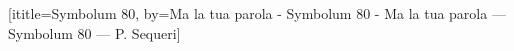 




[ititle={Symbolum 80}, by={\ifacinquevert \iftwocolumns Ma la tua parola - Symbolum 80 - \else Ma la tua parola — Symbolum 80 — \fi\fi  P. Sequeri}] 	%
\ifchorded
\fi



\ifchorded
\vspace*{\versesep}
\vspace*{-\versesep}
\beginverse*



\nolyrics

